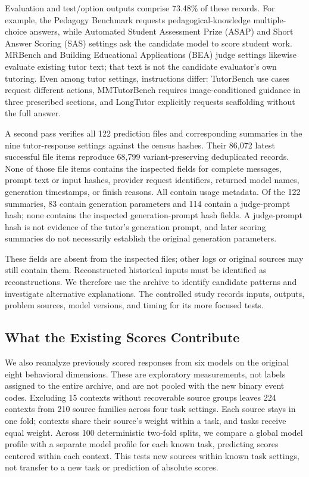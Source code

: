 Evaluation and test/option outputs comprise 73.48\% of these records. For
example, the Pedagogy Benchmark requests pedagogical-knowledge multiple-choice
answers, while Automated Student Assessment Prize (ASAP) and Short Answer
Scoring (SAS) settings ask the candidate model to score student work.
MRBench and Building Educational Applications (BEA) judge settings likewise
evaluate existing tutor text; that text
is not the candidate evaluator's own tutoring. Even among tutor settings,
instructions differ: TutorBench use cases request different actions, MMTutorBench
requires image-conditioned guidance in three prescribed sections, and LongTutor
\citep{li2026longtutor}
explicitly requests scaffolding without the full answer.

A second pass verifies all 122 prediction files and corresponding summaries in
the nine tutor-response settings against the census hashes. Their 86,072 latest
successful file items reproduce 68,799 variant-preserving deduplicated records.
None of those file items contains the inspected fields for complete messages,
prompt text or input hashes, provider request identifiers, returned model names,
generation timestamps, or finish reasons. All contain usage metadata. Of the
122 summaries, 83 contain generation parameters and 114 contain a judge-prompt
hash; none contains the inspected generation-prompt hash fields. A judge-prompt
hash is not evidence of the tutor's generation prompt, and later scoring summaries
do not necessarily establish the original generation parameters.

These fields are absent from the inspected files; other logs or original
sources may still contain them. Reconstructed historical inputs must be
identified as reconstructions. We therefore use the archive to identify candidate patterns and investigate
alternative explanations. The controlled study records inputs, outputs,
problem sources, model versions, and timing for its more focused tests.

\subsection{What the Existing Scores Contribute}
\label{app:archive-reanalysis}

We also reanalyze previously scored responses from six models on the original
eight behavioral dimensions. These are exploratory measurements,
not labels assigned to the entire archive, and are not pooled with the new
binary event codes. Excluding 15 contexts without recoverable source groups
leaves 224 contexts from 210 source families across four task settings. Each
source stays in one fold; contexts share their source's weight within a task,
and tasks receive equal weight. Across 100 deterministic two-fold splits, we
compare a global model profile with a separate model profile for each known
task, predicting scores centered within each context. This tests new sources
within known task settings, not transfer to a new task or prediction of absolute
scores.

